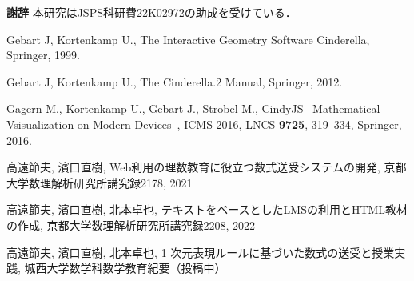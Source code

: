 \documentclass[a4j,12pt]{ujarticle}
\begin{document}
\newpage

\noindent
{\bf 謝辞} 本研究はJSPS科研費22K02972の助成を受けている．

\begin{thebibliography}{00}

 Gebart J, Kortenkamp U., The Interactive Geometry Software Cinderella, Springer, 1999.

 Gebart J, Kortenkamp U., The Cinderella.2 Manual, Springer, 2012.

 Gagern M., Kortenkamp U., Gebart J., Strobel M., CindyJS-- Mathematical Vsisualization on Modern Devices--, ICMS 2016, LNCS \textbf{9725}, 319--334, Springer, 2016.


高遠節夫, 濱口直樹, Web利用の理数教育に役立つ数式送受システムの開発, 京都大学数理解析研究所講究録2178, 2021

高遠節夫, 濱口直樹, 北本卓也, テキストをベースとしたLMSの利用とHTML教材の作成, 京都大学数理解析研究所講究録2208, 2022

高遠節夫, 濱口直樹, 北本卓也, 1 次元表現ルールに基づいた数式の送受と授業実践, 城西大学数学科数学教育紀要（投稿中）

\end{thebibliography}
\end{document}
